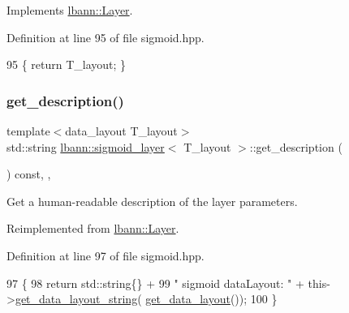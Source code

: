 Implements \hyperlink{classlbann_1_1Layer_a5dfb66e81fc085997402a5e2241316bd}{lbann\+::\+Layer}.



Definition at line 95 of file sigmoid.\+hpp.


\begin{DoxyCode}
95 \{ \textcolor{keywordflow}{return} T\_layout; \}
\end{DoxyCode}
\mbox{\label{classlbann_1_1sigmoid__layer_aa921ef4370e6b4fae38536310d7a3a17}} 
\subsubsection{\texorpdfstring{get\+\_\+description()}{get\_description()}}
{\footnotesize\ttfamily template$<$data\+\_\+layout T\+\_\+layout$>$ \\
std\+::string \hyperlink{classlbann_1_1sigmoid__layer}{lbann\+::sigmoid\+\_\+layer}$<$ T\+\_\+layout $>$\+::get\+\_\+description (\begin{DoxyParamCaption}{ }\end{DoxyParamCaption}) const\hspace{0.3cm}{\ttfamily [inline]}, {\ttfamily [override]}, {\ttfamily [virtual]}}

Get a human-\/readable description of the layer parameters. 

Reimplemented from \hyperlink{classlbann_1_1Layer_acc0803d3428914ca1eb5988c4309174a}{lbann\+::\+Layer}.



Definition at line 97 of file sigmoid.\+hpp.


\begin{DoxyCode}
97                                              \{
98     \textcolor{keywordflow}{return} std::string\{\} +
99      \textcolor{stringliteral}{" sigmoid dataLayout: "} + this->\hyperlink{classlbann_1_1Layer_ae3f4a5602df821f4221614b1e3782dc1}{get\_data\_layout\_string}(
      \hyperlink{classlbann_1_1sigmoid__layer_ab44f3cf5e4622578e40d5254ba73109a}{get\_data\_layout}());
100   \}
\end{DoxyCode}
\mbox{\label{classlbann_1_1sigmoid__layer_a5082da099cb5e56910da4373952b98dc}} 
